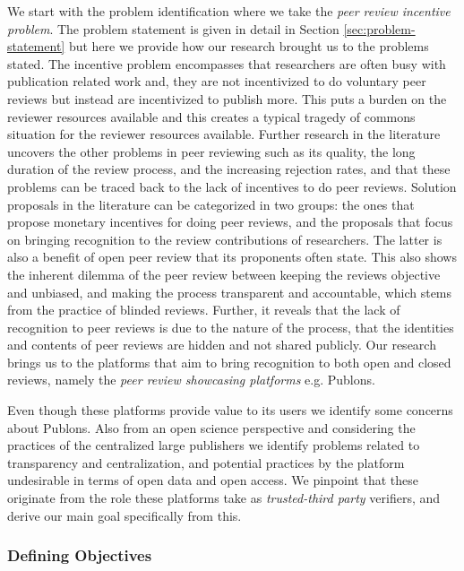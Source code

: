 We start with the problem identification where we take the \textit{peer review incentive problem}. The problem statement is given in detail in Section \ref{sec:problem-statement} but here we provide how our research brought us to the problems stated. The incentive problem encompasses that researchers are often busy with publication related work and, they are not incentivized to do voluntary peer reviews but instead are incentivized to publish more. This puts a burden on the reviewer resources available and this creates a typical tragedy of commons situation \parencite{hardin2009tragedy, Hochberg.2009} for the reviewer resources available. Further research in the literature uncovers the other problems in peer reviewing such as its quality, the long duration of the review process, and the increasing rejection rates, and that these problems can be traced back to the lack of incentives to do peer reviews. Solution proposals in the literature can be categorized in two groups: the ones that propose monetary incentives for doing peer reviews, and the proposals that focus on bringing recognition to the review contributions of researchers. The latter is also a benefit of open peer review that its proponents often state. This also shows the inherent dilemma of the peer review between keeping the reviews objective and unbiased, and making the process transparent and accountable, which stems from the practice of blinded reviews. Further, it reveals that the lack of recognition to peer reviews is due to the nature of the process, that the identities and contents of peer reviews are hidden and not shared publicly. Our research brings us to the platforms that aim to bring recognition to both open and closed reviews, namely the \textit{peer review showcasing platforms} e.g. Publons. 

Even though these platforms provide value to its users we identify some concerns about Publons. Also from an open science perspective and considering the practices of the centralized large publishers \parencite{Lariviere.2015} we identify problems related to transparency and centralization, and potential practices by the platform undesirable in terms of open data and open access. We pinpoint that these originate from the role these platforms take as \textit{trusted-third party} verifiers, and derive our main goal specifically from this. 

\subsubsection{Defining Objectives}

